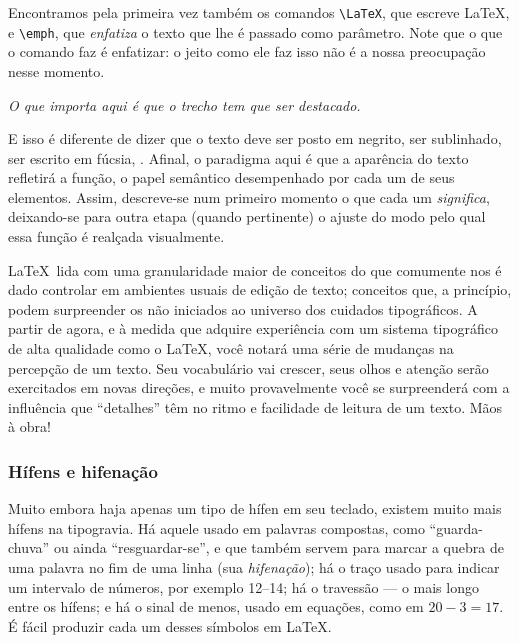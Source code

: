 Encontramos pela primeira vez também os comandos \verb'\LaTeX', que
escreve \LaTeX, e \verb'\emph', que \emph{enfatiza} o texto que lhe é
passado como parâmetro. Note que o que o comando faz é enfatizar: o
jeito como ele faz isso não é a nossa preocupação nesse momento.

\begin{center}
\it O que importa aqui é que o trecho tem que ser destacado.  
\end{center}

E isso é diferente de dizer que o texto deve ser posto em negrito, ser
sublinhado, ser escrito em fúcsia,  
  . Afinal, o
paradigma aqui é que a aparência do texto refletirá a função, o papel
semântico desempenhado por cada um de seus elementos. Assim,
descreve-se num primeiro momento o que cada um
\emph{significa},
deixando-se para outra etapa (quando pertinente) o ajuste do modo pelo
qual essa função é realçada visualmente.

\LaTeX\ lida com uma granularidade maior de conceitos do que comumente
nos é dado controlar em ambientes usuais de edição de texto; conceitos
que, a princípio, podem surpreender os não iniciados ao universo dos
cuidados tipográficos. A partir de agora, e à medida que adquire
experiência com um sistema tipográfico de alta qualidade como o
\LaTeX, você notará uma série de mudanças na percepção de um texto. Seu
vocabulário vai crescer, seus olhos e atenção serão exercitados em
novas direções, e muito provavelmente você se surpreenderá com a
influência que ``detalhes'' têm no ritmo e facilidade de leitura de um
texto. Mãos à obra!

\subsubsection{Hífens e hifenação}\label{subsec:hifenacao}

Muito embora haja apenas um tipo de hífen em seu teclado, existem
muito mais hífens na tipogravia. Há aquele usado em palavras
compostas, como ``guarda-chuva'' ou ainda ``resguardar-se'', e que também
servem para marcar a quebra de uma palavra no fim de uma linha
(sua \emph{hifenação}); há o traço usado para indicar um intervalo de números,
por exemplo 12--14; há o travessão --- o mais longo entre os hífens; e
há o sinal de menos, usado em equações, como em $20-3=17$. É fácil
produzir cada um desses símbolos em \LaTeX.

